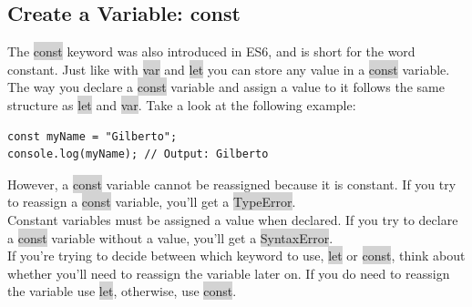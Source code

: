 \documentclass[11pt]{article}
\begin{document}
\subsection{Create a Variable: const}
The \colorbox{lightgray}{const} keyword was also introduced in ES6, and is short for the word constant. Just like with \colorbox{lightgray}{var} and \colorbox{lightgray}{let} you can store any value in a \colorbox{lightgray}{const} variable. The way you declare a \colorbox{lightgray}{const} variable and assign a value to it follows the same structure as \colorbox{lightgray}{let} and \colorbox{lightgray}{var}. Take a look at the following example: 
\begin{lstlisting}
const myName = "Gilberto";
console.log(myName); // Output: Gilberto
\end{lstlisting}
However, a \colorbox{lightgray}{const} variable cannot be reassigned because it is constant. If you try to reassign a \colorbox{lightgray}{const} variable, you’ll get a \colorbox{lightgray}{TypeError}. \\
\newline
Constant variables must be assigned a value when declared. If you try to declare a \colorbox{lightgray}{const} variable without a value, you’ll get a \colorbox{lightgray}{SyntaxError}. \\
\newline
If you’re trying to decide between which keyword to use, \colorbox{lightgray}{let} or \colorbox{lightgray}{const}, think about whether you’ll need to reassign the variable later on. If you do need to reassign the variable use \colorbox{lightgray}{let}, otherwise, use \colorbox{lightgray}{const}.
\end{document}

